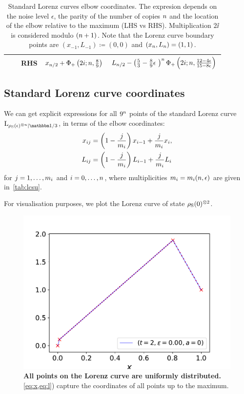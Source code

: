 \begin{table}[h]
\begin{tabular}{c|c|c|r|r}
    & & RHS & $x_{n/2} + \Phi_+\left(2i;n,\frac{8}{9}\right)$ & $L_{\NN/2} - \left( \frac{5}{3} - \frac{8}{9}\epsilon\ \right)^\NN\Phi_+\left(2\ii;\NN,\frac{12-4\epsilon}{15-8\epsilon}\right)$ \\ \hline
  \end{tabular}
  \caption{Standard Lorenz curves elbow coordinates.
  The expresion depends on the noise level $\epsilon$, the parity of the number of copies $n$ and the location of the elbow relative to the maximum (LHS vs RHS).
  Multiplication $2\ii$ is considered modulo $(n+1)$.
  Note that the Lorenz curve boundary points are $(x_{-1}, L_{-1}) \coloneqq (0,0)$ and $(x_{n}, L_{n}) = (1,1)$.
  }
  \label{tab:lcsu_coord_elb_app}
\end{table}

\subsection{Standard Lorenz curve coordinates}\label{app:lcsu_coord}
We can get explicit expressions for all $9^{n}$ points of the standard Lorenz curve $\lc{\noisysN}{\id/3}$, in terms of the elbow coordinates:
\begin{align}
    x_{ij} &= \left( 1-\frac{j}{m_{i}} \right) x_{i-1} + \frac{j}{m_{i}} x_{i}, \label{eq:x}\\
    L_{ij} &= \left( 1-\frac{j}{m_{i}} \right) L_{i-1} + \frac{j}{m_{i}} L_{i} \label{eq:l}
\end{align}
for $j = 1,\dots,m_{i}$ and $i=0,\dots,n$, where multiplicities $m_i = m_i(n, \epsilon)$ are given in~\cref{tab:lcsu}.

For visualisation purposes, we plot the Lorenz curve of state $\rho_{\rm{S}}(0)^{\otimes 2}$.
\begin{figure}[t]
    \centering
    \includegraphics[scale=0.6]{figs/lcpoints.pdf}
    \caption{\textbf{All points on the Lorenz curve are uniformly distributed.}
    \cref{eq:x,eq:l}) capture the coordinates of all points up to the maximum.
    }
    \label{fig:lc}
\end{figure}

